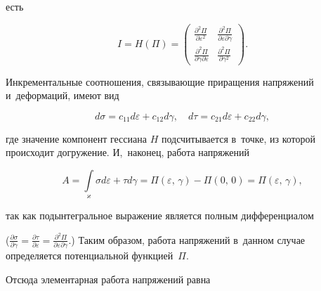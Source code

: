 есть

$$

I=H(\Pi)=\left (

 \begin{array}{cc}

         \displaystyle\frac{\partial^{2} \Pi}{\partial

\varepsilon^{2}} & \displaystyle\frac{\partial^{2} \Pi}{\partial

\varepsilon

\partial \gamma}\\

         \displaystyle\frac{\partial^{2} \Pi}{\partial

\gamma

\partial \varepsilon} & \displaystyle\frac{\partial^{2} \Pi} {\partial

\gamma^{2}}

 \end{array}

 \right).

$$



Инкрементальные соотношения, связывающие приращения напряжений и~деформаций, имеют вид

$$

d \sigma=c_{11}d \varepsilon+c_{12}d\gamma,\quad d \tau=c_{21}d

\varepsilon+c_{22}d\gamma,

$$

где значение компонент гессиана $H$ подсчитывается в~точке, из которой происходит догружение. И,~наконец, работа напряжений

$$

A=\int\limits_{\varkappa} \sigma d \varepsilon+\tau d

\gamma=\Pi(\varepsilon,\,\gamma)-\Pi(0,\,0)=\Pi(\varepsilon,\,\gamma),

$$

так как подынтегральное выражение является полным дифференциалом

($\frac{\partial \sigma} {\partial

\gamma}=\frac{\partial \tau} {\partial

\varepsilon}=\frac{\partial^{2} \Pi}{\partial

\varepsilon\partial \gamma}.$) Таким образом, работа напряжений в~данном случае определяется потенциальной функцией~$\Pi.$ 



Отсюда элементарная работа напряжений равна

